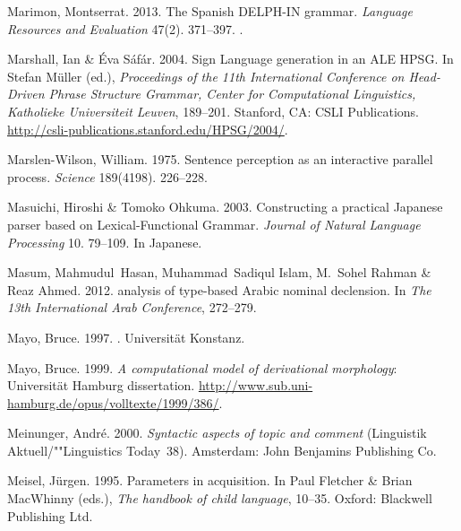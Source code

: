 \begin{thebibliography}{1420}
Marimon, Montserrat. 2013.
\newblock The {Spanish} {DELPH-IN} grammar.
\newblock \emph{Language Resources and Evaluation} 47(2). 371--397.
\newblock {}.

Marshall, Ian \& {\'E}va S{\'a}f{\'a}r. 2004.
\newblock Sign {Language} generation in an {ALE HPSG}.
\newblock In Stefan M{\"u}ller (ed.), \emph{Proceedings of the {11th
  International Conference on Head-Driven Phrase Structure Grammar, Center for
  Computational Linguistics, Katholieke Universiteit Leuven}}, 189--201.
  Stanford, CA: CSLI Publications.
\newblock \urlprefix\url{http://csli-publications.stanford.edu/HPSG/2004/}.

Marslen-Wilson, William. 1975.
\newblock Sentence perception as an interactive parallel process.
\newblock \emph{Science} 189(4198). 226--228.

Masuichi, Hiroshi \& Tomoko Ohkuma. 2003.
\newblock Constructing a practical {Japanese} parser based on
  {Lexical-Functional Grammar}.
\newblock \emph{Journal of Natural Language Processing} 10. 79--109.
\newblock In {Japanese}.

Masum, Mahmudul~Hasan, Muhammad~Sadiqul Islam, M.~Sohel Rahman \& Reaz Ahmed.
  2012.
 analysis of type-based {Arabic} nominal declension.
\newblock In \emph{The {13th International Arab Conference}}, 272--279.

Mayo, Bruce. 1997.
.
 Universit{\"a}t Konstanz.

Mayo, Bruce. 1999.
\newblock \emph{A computational model of derivational morphology}:
  Universit{\"a}t Hamburg dissertation.
\newblock
  \urlprefix\url{http://www.sub.uni-hamburg.de/opus/volltexte/1999/386/}.

Meinunger, Andr{\'e}. 2000.
\newblock \emph{Syntactic aspects of topic and comment} (Linguistik
  Aktuell/""Linguistics Today~38).
\newblock Amsterdam: John Benjamins Publishing Co.

Meisel, J{\"u}rgen. 1995.
\newblock Parameters in acquisition.
\newblock In Paul Fletcher \& Brian MacWhinny (eds.), \emph{The handbook of
  child language}, 10--35. Oxford: Blackwell Publishing Ltd.


\end{thebibliography}
